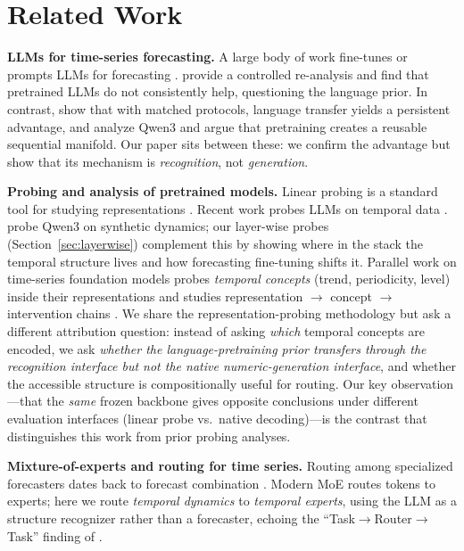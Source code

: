 \documentclass{article}
\begin{document}
\section{Related Work}\label{sec:related}

\textbf{LLMs for time-series forecasting.}  A large body of work fine-tunes or
prompts LLMs for forecasting \citep{gruver2023large,time-llm2023,qwen-time,
new2022,zhou2024one}.  \citet{tan2024are} provide a controlled re-analysis and
find that pretrained LLMs do not consistently help, questioning the language
prior.  In contrast, \citet{randominit2025} show that with matched protocols,
language transfer yields a persistent advantage, and \citet{manifold2026}
analyze Qwen3 and argue that pretraining creates a reusable sequential
manifold.  Our paper sits between these: we confirm the advantage but show
that its mechanism is \emph{recognition}, not \emph{generation}.

\textbf{Probing and analysis of pretrained models.}  Linear probing is a
standard tool for studying representations \citep{alain2016understanding,
beldon2018measuring}.  Recent work probes LLMs on temporal data
\citep{liu2024pre-training,tan2024are}.  \citet{manifold2026} probe Qwen3 on
synthetic dynamics; our layer-wise probes (Section~\ref{sec:layerwise})
complement this by showing where in the stack the temporal structure lives and
how forecasting fine-tuning shifts it.  Parallel work on time-series
foundation models probes \emph{temporal concepts} (trend, periodicity, level)
inside their representations and studies representation $\to$ concept $\to$
intervention chains \citep{tsfm_probe2025,tsfm_intervention2025}.  We share
the representation-probing methodology but ask a different attribution
question: instead of asking \emph{which} temporal concepts are encoded, we ask
\emph{whether the language-pretraining prior transfers through the
recognition interface but not the native numeric-generation interface}, and
whether the accessible structure is compositionally useful for routing.  Our
key observation---that the \emph{same} frozen backbone gives opposite
conclusions under different evaluation interfaces (linear probe vs.\ native
decoding)---is the contrast that distinguishes this work from prior probing
analyses.

\textbf{Mixture-of-experts and routing for time series.}  Routing among
specialized forecasters dates back to forecast combination
\citep{bates1969combination}.  Modern MoE \citep{shazeer2017outrageously}
routes tokens to experts; here we route \emph{temporal dynamics} to
\emph{temporal experts}, using the LLM as a structure recognizer rather than a
forecaster, echoing the ``Task$\to$Router$\to$Task'' finding of
\citet{waveTLM2025}.
\end{document}
